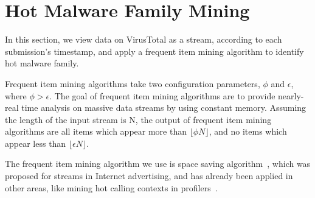 \section{Hot Malware Family Mining}
\label{sec:hot}

In this section, we view data on VirusTotal as a stream, according to each submission's timestamp, 
and apply a frequent item mining algorithm to identify hot malware family. 

Frequent item mining algorithms take two configuration parameters, $\phi$ and $\epsilon$, where $\phi > \epsilon$. 
The goal of frequent item mining algorithms are to provide nearly-real time analysis on massive data streams by using constant memory. 
Assuming the length of the input stream is N, the output of frequent item mining algorithms 
are all items which appear more than $\lfloor \phi N \rfloor$, 
and no items which appear less than  $\lfloor \epsilon N \rfloor$. 

The frequent item mining algorithm we use is space saving algorithm~\cite{space-saving}, 
which was proposed for streams in Internet advertising, and has already been applied in other areas, 
like mining hot calling contexts in profilers~\cite{hot-calling-context}. 